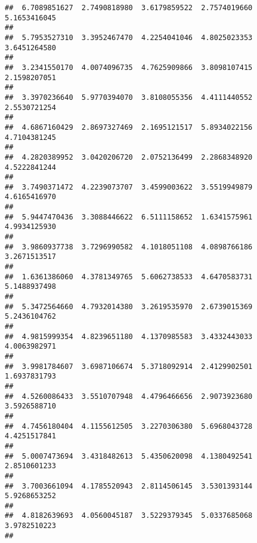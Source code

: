 \documentclass[]{article}
\begin{document}
\begin{verbatim}
##  6.7089851627  2.7490818980  3.6179859522  2.7574019660  5.1653416045 
##                                                                       
##  5.7953527310  3.3952467470  4.2254041046  4.8025023353  3.6451264580 
##                                                                       
##  3.2341550170  4.0074096735  4.7625909866  3.8098107415  2.1598207051 
##                                                                       
##  3.3970236640  5.9770394070  3.8108055356  4.4111440552  2.5530721254 
##                                                                       
##  4.6867160429  2.8697327469  2.1695121517  5.8934022156  4.7104381245 
##                                                                       
##  4.2820389952  3.0420206720  2.0752136499  2.2868348920  4.5222841244 
##                                                                       
##  3.7490371472  4.2239073707  3.4599003622  3.5519949879  4.6165416970 
##                                                                       
##  5.9447470436  3.3088446622  6.5111158652  1.6341575961  4.9934125930 
##                                                                       
##  3.9860937738  3.7296990582  4.1018051108  4.0898766186  3.2671513517 
##                                                                       
##  1.6361386060  4.3781349765  5.6062738533  4.6470583731  5.1488937498 
##                                                                       
##  5.3472564660  4.7932014380  3.2619535970  2.6739015369  5.2436104762 
##                                                                       
##  4.9815999354  4.8239651180  4.1370985583  3.4332443033  4.0063982971 
##                                                                       
##  3.9981784607  3.6987106674  5.3718092914  2.4129902501  1.6937831793 
##                                                                       
##  4.5260086433  3.5510707948  4.4796466656  2.9073923680  3.5926588710 
##                                                                       
##  4.7456180404  4.1155612505  3.2270306380  5.6968043728  4.4251517841 
##                                                                       
##  5.0007473694  3.4318482613  5.4350620098  4.1380492541  2.8510601233 
##                                                                       
##  3.7003661094  4.1785520943  2.8114506145  3.5301393144  5.9268653252 
##                                                                       
##  4.8182639693  4.0560045187  3.5229379345  5.0337685068  3.9782510223 
##                                                                       

\end{verbatim}
\end{document}
